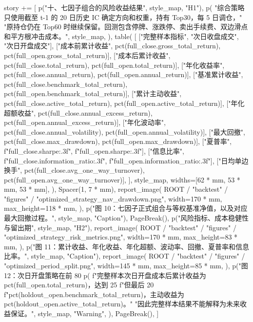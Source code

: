 \documentclass[UTF8,a4paper,fontset=fandol]{ctexart}
\begin{document}
\begin{ProjectCode}
    story += [
        p("十、七因子组合的风险收益结果", style_map, "H1"),
        p(
            "综合策略只使用截至 t-1 的 20 日历史 IC 确定方向和权重，持有 Top30，每 5 日调仓，"
            "原持仓仍在 Top60 时继续保留。回测包含停牌、涨跌停、卖出手续费、双边滑点和平方根冲击成本。",
            style_map,
        ),
        table(
            [
                ["完整样本指标", "次日收盘成交", "次日开盘成交"],
                ["成本前累计收益", pct(full_close.gross_total_return), pct(full_open.gross_total_return)],
                ["成本后累计收益", pct(full_close.total_return), pct(full_open.total_return)],
                ["年化收益率", pct(full_close.annual_return), pct(full_open.annual_return)],
                ["基准累计收益", pct(full_close.benchmark_total_return), pct(full_open.benchmark_total_return)],
                ["累计主动收益", pct(full_close.active_total_return), pct(full_open.active_total_return)],
                ["年化超额收益", pct(full_close.annual_excess_return), pct(full_open.annual_excess_return)],
                ["年化波动率", pct(full_close.annual_volatility), pct(full_open.annual_volatility)],
                ["最大回撤", pct(full_close.max_drawdown), pct(full_open.max_drawdown)],
                ["夏普率", f"{full_close.sharpe:.3f}", f"{full_open.sharpe:.3f}"],
                ["信息比率", f"{full_close.information_ratio:.3f}", f"{full_open.information_ratio:.3f}"],
                ["日均单边换手", pct(full_close.avg_one_way_turnover), pct(full_open.avg_one_way_turnover)],
            ],
            style_map,
            widths=[62 * mm, 53 * mm, 53 * mm],
        ),
        Spacer(1, 7 * mm),
        report_image(
            ROOT / "backtest" / "figures" / "optimized_strategy_nav_drawdown.png",
            width=170 * mm,
            max_height=118 * mm,
        ),
        p("图 10：七因子正式组合与等权基准净值，以及对应最大回撤过程。", style_map, "Caption"),
        PageBreak(),
        p("风险指标、成本稳健性与留出期", style_map, "H2"),
        report_image(
            ROOT / "backtest" / "figures" / "optimized_strategy_risk_metrics.png",
            width=170 * mm,
            max_height=83 * mm,
        ),
        p("图 11：累计收益、年化收益、年化超额、波动率、回撤、夏普率和信息比率。", style_map, "Caption"),
        report_image(
            ROOT / "backtest" / "figures" / "optimized_period_split.png",
            width=145 * mm,
            max_height=85 * mm,
        ),
        p("图 12：次日开盘策略在前 80%
        p(
            f"完整样本次日开盘成本后累计收益为 {pct(full_open.total_return)}，达到 25%
            f"但最后 20%
            f"{pct(holdout_open.benchmark_total_return)}，主动收益为 {pct(holdout_open.active_total_return)}。"
            "因此完整样本结果不能解释为未来收益保证。",
            style_map,
            "Warning",
        ),
        PageBreak(),
    ]


\end{ProjectCode}
\end{document}
